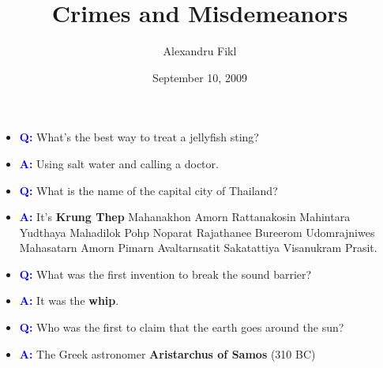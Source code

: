 \documentclass[14pt]{beamer}
\title{Crimes and Misdemeanors}
\author{Alexandru Fikl}
\date{September 10, 2009}
\newcommand{\tc}[1]{\textcolor{blue}{\textbf{#1}}}
\begin{document}
\begin{frame}
 \titlepage
\end{frame}

\begin{frame}
\vfill
\begin{center}
    \large
\begin{itemize}[<+-| alert@+>]
    \item[] \tc{Q:} What’s the best way to treat a jellyfish sting?
    \item[] \tc{A:} Using salt water and calling a doctor.
\end{itemize}
\end{center}
\vfill
\end{frame}

\begin{frame}
\vfill
\begin{center}
    \large
\begin{itemize}[<+-| alert@+>]
    \item[] \tc{Q:} What is the name of the capital city of Thailand?
    \item[] \tc{A:} It's \textbf{Krung Thep} Mahanakhon Amorn Rattanakosin Mahintara Yudthaya
    Mahadilok Pohp Noparat Rajathanee Bureerom Udomrajniwes Mahasatarn Amorn Pimarn
    Avaltarnsatit Sakatattiya Visanukram Prasit.
\end{itemize}
\end{center}
\vfill
\end{frame}

\begin{frame}
\vfill
\begin{center}
    \large
\begin{itemize}[<+-| alert@+>]
    \item[] \tc{Q:} What was the first invention to break the sound barrier?
    \item[] \tc{A:} It was the \textbf{whip}.
\end{itemize}
\end{center}
\vfill
\end{frame}

\begin{frame}
\vfill
\begin{center}
    \large
\begin{itemize}[<+-| alert@+>]
    \item[] \tc{Q:} Who was the first to claim that the earth goes around the sun?
    \item[] \tc{A:} The Greek astronomer \textbf{Aristarchus of Samos} (310 BC)
\end{itemize}
\end{center}
\vfill
\end{frame}
\end{document}
